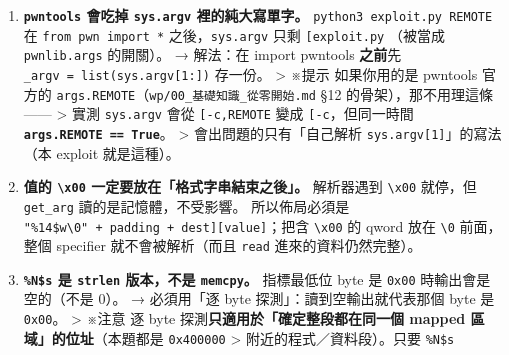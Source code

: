 \documentclass[10pt,a4paper]{article}
\begin{document}
\begin{enumerate}
\def\labelenumi{\arabic{enumi}.}
\item
  \textbf{\texttt{pwntools} 會吃掉 \texttt{sys.\allowbreak{}argv} 裡的純大寫單字。}
  \texttt{python3\ \allowbreak{}exploit.\allowbreak{}py\ \allowbreak{}REMOTE} 在 \texttt{from\ \allowbreak{}pwn\ \allowbreak{}import\ \allowbreak{}*}
  之後，\texttt{sys.\allowbreak{}argv} 只剩
  \texttt{{[}\textquotesingle{}\allowbreak{}exploit.\allowbreak{}py\textquotesingle{}\allowbreak{}{]}} （被當成
  \texttt{pwnlib.\allowbreak{}args} 的開關）。 → 解法：在 import pwntools
  \textbf{之前}先 \texttt{\_\allowbreak{}argv\ \allowbreak{}=\ \allowbreak{}list(sys.\allowbreak{}argv{[}1:{]})} 存一份。
  \textgreater{} ※提示 如果你用的是 pwntools 官方的
  \texttt{args.\allowbreak{}REMOTE}（\texttt{wp/\allowbreak{}00\_\allowbreak{}基礎知識\_\allowbreak{}從零開始.\allowbreak{}md} §12
  的骨架），那不用理這條 ------ \textgreater{} 實測 \texttt{sys.\allowbreak{}argv}
  會從
  \texttt{{[}\textquotesingle{}\allowbreak{}-\allowbreak{}c\textquotesingle{}\allowbreak{},\allowbreak{}\textquotesingle{}\allowbreak{}REMOTE\textquotesingle{}\allowbreak{}{]}}
  變成 \texttt{{[}\textquotesingle{}\allowbreak{}-\allowbreak{}c\textquotesingle{}\allowbreak{}{]}}，但同一時間
  \textbf{\texttt{args.\allowbreak{}REMOTE\ \allowbreak{}==\ \allowbreak{}True}}。 \textgreater{}
  會出問題的只有「自己解析 \texttt{sys.\allowbreak{}argv{[}1{]}}」的寫法（本 exploit
  就是這種）。
\item
  \textbf{值的 \texttt{\textbackslash{}\allowbreak{}x00}
  一定要放在「格式字串結束之後」。} 解析器遇到
  \texttt{\textbackslash{}\allowbreak{}x00} 就停，但 \texttt{get\_\allowbreak{}arg}
  讀的是記憶體，不受影響。 所以佈局必須是
  \texttt{"\%\allowbreak{}14\$\allowbreak{}w\textbackslash{}\allowbreak{}0"\ \allowbreak{}+\ \allowbreak{}padding\ \allowbreak{}+\ \allowbreak{}{[}dest{]}{[}value{]}}；把含
  \texttt{\textbackslash{}\allowbreak{}x00} 的 qword 放在 \texttt{\textbackslash{}\allowbreak{}0}
  前面， 整個 specifier 就不會被解析（而且 \texttt{read}
  進來的資料仍然完整）。
\item
  \textbf{\texttt{\%\allowbreak{}N\$\allowbreak{}s} 是 \texttt{strlen} 版本，不是
  \texttt{memcpy}。} 指標最低位 byte 是 \texttt{0x00}
  時輸出會是空的（不是 0）。 → 必須用「逐 byte
  探測」：讀到空輸出就代表那個 byte 是 \texttt{0x00}。 \textgreater{}
  ※注意 逐 byte 探測\textbf{只適用於「確定整段都在同一個 mapped
  區域」的位址}（本題都是 \texttt{0x400000} \textgreater{}
  附近的程式／資料段）。只要 \texttt{\%\allowbreak{}N\$\allowbreak{}s}

\end{enumerate}
\end{document}
